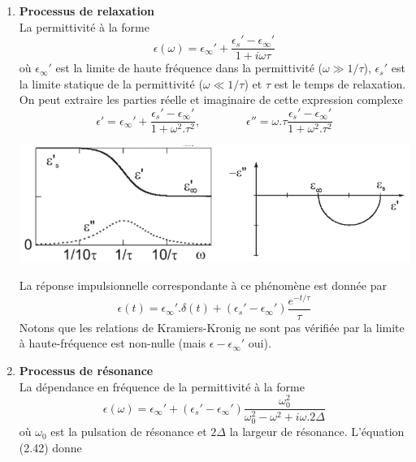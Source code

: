 \begin{enumerate}
\item \textbf{Processus de relaxation}\\
La permittivité à la forme
\begin{equation}
\epsilon(\omega) = \epsilon_\infty'+\dfrac{\epsilon_s'-\epsilon_\infty'}{1+i\omega\tau}
\end{equation}
où $\epsilon_\infty'$ est la limite de haute fréquence dans la permittivité ($\omega \gg 1/\tau$), 
$\epsilon_s'$ est la limite statique de la permittivité ($\omega \ll 1/\tau$) et $\tau$ est le temps
de relaxation. On peut extraire les parties réelle et imaginaire de cette expression complexe
\begin{equation}
\epsilon' = \epsilon_\infty'+\dfrac{\epsilon_s'-\epsilon_\infty'}{1+\omega^2.\tau^2},\qquad\qquad
\epsilon'' = \omega.\tau \dfrac{\epsilon_s'-\epsilon_\infty'}{1+\omega^2.\tau^2}
\end{equation}
\begin{center}
\includegraphics[scale=0.5]{ch2/image1}
\end{center}
La réponse impulsionnelle correspondante à ce phénomène est donnée par
\begin{equation}
\epsilon(t) = \epsilon_\infty'.\delta(t) +(\epsilon_s'-\epsilon_\infty')\dfrac{e^{-t/\tau}}{\tau}
\end{equation}
Notons que les relations de Kramiers-Kronig ne sont pas vérifiée par la limite à haute-fréquence est
non-nulle (mais $\epsilon-\epsilon_\infty'$ oui).
\newpage
\item \textbf{Processus de résonance}\\
La dépendance en fréquence de la permittivité à la forme
\begin{equation}
\epsilon(\omega) = \epsilon_\infty'+(\epsilon_s'-\epsilon_\infty')\dfrac{\omega_0^2}{\omega_0^2-\omega^2
+i\omega.2\Delta}
\end{equation}
où $\omega_0$ est la pulsation de résonance et $2\Delta$ la largeur de résonance. L'équation (2.42) donne

\end{enumerate}
